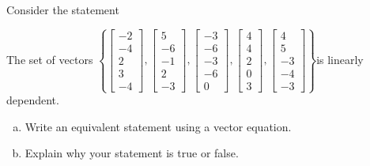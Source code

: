 
\begin{exerciseStatement}


Consider the statement 
\begin{center}\begin{minipage}{0.8\textwidth}
 The set of vectors \( \left\{ \left[\begin{array}{c}
-2 \\
-4 \\
2 \\
3 \\
-4
\end{array}\right] , \left[\begin{array}{c}
5 \\
-6 \\
-1 \\
2 \\
-3
\end{array}\right] , \left[\begin{array}{c}
-3 \\
-6 \\
-3 \\
-6 \\
0
\end{array}\right] , \left[\begin{array}{c}
4 \\
4 \\
2 \\
0 \\
3
\end{array}\right] , \left[\begin{array}{c}
4 \\
5 \\
-3 \\
-4 \\
-3
\end{array}\right] \right\} \)is linearly dependent.
\end{minipage}\end{center}
    


\begin{enumerate}[(a)]
\item  Write an equivalent statement using a vector equation.
\item  Explain why your statement is true or false.
\end{enumerate}
    
\end{exerciseStatement}
    
